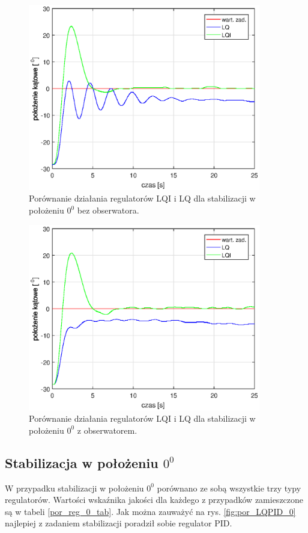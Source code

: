 \documentclass[11pt,a4paper]{article}
\begin{document}
\begin{figure}[H]
	\centering
	\includegraphics[width=4in]{Figures/por_LQ0.eps}
	\caption{Porównanie działania regulatorów LQI i LQ dla stabilizacji w położeniu $0 ^0$ bez obserwatora.}
	\label{fig:por_LQ0}
\end{figure}

\begin{figure}[H]
	\centering
	\includegraphics[width=4in]{Figures/por_LQ0obs.eps}
	\caption{Porównanie działania regulatorów LQI i LQ dla stabilizacji w położeniu $0 ^0$ z obserwatorem.}
	\label{fig:por_LQ0obs}
\end{figure}

\subsection{Stabilizacja w położeniu $0^0$}
W przypadku stabilizacji w położeniu $0^0$ porównano ze sobą wszystkie trzy typy regulatorów. Wartości wska\'znika jakości dla każdego z przypadków zamieszczone są w tabeli \ref{por_reg_0_tab}. Jak można zauważyć na rys. \ref{fig:por_LQPID_0} najlepiej z zadaniem stabilizacji poradził sobie regulator PID. 
\end{document}
